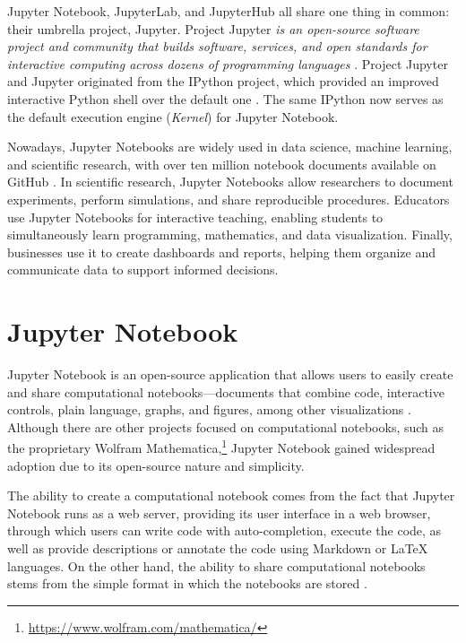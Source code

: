 \documentclass[
  digital,     %
  oneside,     %
  nosansbold,  %
  nocolorbold, %
  lof,         %
  nolot,         %
]{fithesis4}
\begin{document}
Jupyter Notebook, JupyterLab, and JupyterHub all share one thing in common: their umbrella project, Jupyter.
Project Jupyter \emph{is an open-source software project and community that builds software, services, and open standards for interactive computing across dozens of programming languages} \cite{granger2021jupyter}.
Project Jupyter and Jupyter originated from the IPython project, which provided an improved interactive Python shell over the default one \cite{ipython}. The same IPython now serves as the default execution engine (\emph{Kernel}) for Jupyter Notebook.

Nowadays, Jupyter Notebooks are widely used in data science, machine learning, and scientific research, with over ten million notebook documents available on GitHub \cite{granger2021jupyter}. In scientific research, Jupyter Notebooks allow researchers to document experiments, perform simulations, and share reproducible procedures. Educators use Jupyter Notebooks for interactive teaching, enabling students to simultaneously learn programming, mathematics, and data visualization. 
Finally, businesses use it to create dashboards and reports, helping them organize and communicate data to support informed decisions.

\section{Jupyter Notebook}
Jupyter Notebook is an open-source application that allows users to easily create and share computational notebooks---documents that combine code, interactive controls, plain language, graphs, and figures, among other visualizations \cite{granger2021jupyter}. Although there are other projects focused on computational notebooks, such as the proprietary Wolfram Mathematica,\footnote{\url{https://www.wolfram.com/mathematica/}} Jupyter Notebook gained widespread adoption due to its open-source nature and simplicity.

The ability to create a computational notebook comes from the fact that Jupyter Notebook runs as a web server, providing its user interface in a web browser, through which users can write code with auto-completion, execute the code, as well as provide descriptions or annotate the code using Markdown or LaTeX languages. On the other hand, the ability to share computational notebooks stems from the simple format in which the notebooks are stored \cite{jupyter_notebook}.
\end{document}
